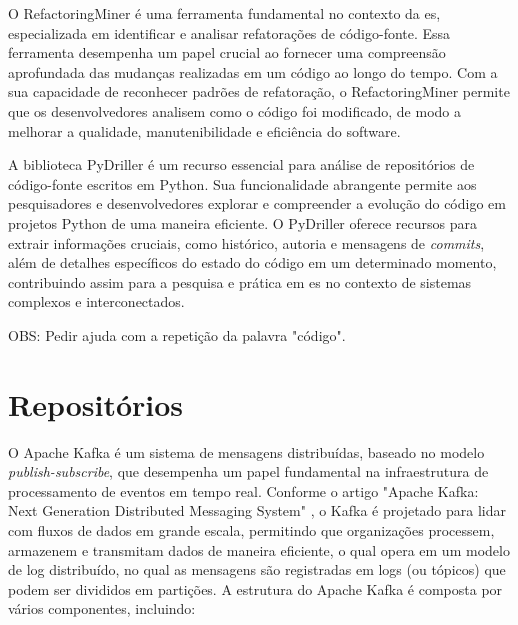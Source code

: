 O RefactoringMiner \cite{Tsantalis:ICSE:2018:RefactoringMiner} é uma ferramenta fundamental no contexto da \gls{es}, especializada em identificar e analisar refatorações de código-fonte. Essa ferramenta desempenha um papel crucial ao fornecer uma compreensão aprofundada das mudanças realizadas em um código ao longo do tempo. Com a sua capacidade de reconhecer padrões de refatoração, o RefactoringMiner permite que os desenvolvedores analisem como o código foi modificado, de modo a melhorar a qualidade, manutenibilidade e eficiência do software.

A biblioteca PyDriller \cite{PyDrillerSpadini2018} é um recurso essencial para análise de repositórios de código-fonte escritos em Python. Sua funcionalidade abrangente permite aos pesquisadores e desenvolvedores explorar e compreender a evolução do código em projetos Python de uma maneira eficiente. O PyDriller oferece recursos para extrair informações cruciais, como histórico, autoria e mensagens de \textit{commits}, além de detalhes específicos do estado do código em um determinado momento, contribuindo assim para a pesquisa e prática em \gls{es} no contexto de sistemas complexos e interconectados.

OBS: Pedir ajuda com a repetição da palavra "código".

\section{Repositórios}\label{sec:repositorios}
O Apache Kafka \cite{KafkaGitHub} é um sistema de mensagens distribuídas, baseado no modelo \textit{publish-subscribe}, que desempenha um papel fundamental na infraestrutura de processamento de eventos em tempo real. Conforme o artigo "Apache Kafka: Next Generation Distributed Messaging System" \cite{ApacheKafkaNextGenerationDistributedMessagingSystem:2010}, o Kafka é projetado para lidar com fluxos de dados em grande escala, permitindo que organizações processem, armazenem e transmitam dados de maneira eficiente, o qual opera em um modelo de log distribuído, no qual as mensagens são registradas em logs (ou tópicos) que podem ser divididos em partições. 
A estrutura do Apache Kafka é composta por vários componentes, incluindo:

